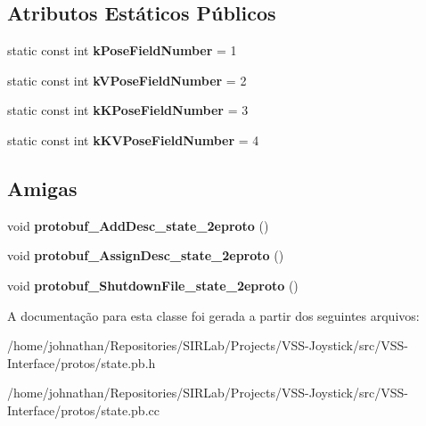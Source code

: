 \subsection*{Atributos Estáticos Públicos}
\begin{DoxyCompactItemize}
\item 
static const int {\bfseries k\+Pose\+Field\+Number} = 1\hypertarget{classvss__state_1_1Ball__State_aa0d51eebda087326095eff02cc80481c}{}\label{classvss__state_1_1Ball__State_aa0d51eebda087326095eff02cc80481c}

\item 
static const int {\bfseries k\+V\+Pose\+Field\+Number} = 2\hypertarget{classvss__state_1_1Ball__State_aa9df3d7a047296c119dfc35ae5e86b54}{}\label{classvss__state_1_1Ball__State_aa9df3d7a047296c119dfc35ae5e86b54}

\item 
static const int {\bfseries k\+K\+Pose\+Field\+Number} = 3\hypertarget{classvss__state_1_1Ball__State_a31603cacf64917d3088585f33290114a}{}\label{classvss__state_1_1Ball__State_a31603cacf64917d3088585f33290114a}

\item 
static const int {\bfseries k\+K\+V\+Pose\+Field\+Number} = 4\hypertarget{classvss__state_1_1Ball__State_a8d49de5cec51b6a22e828da61fa8810b}{}\label{classvss__state_1_1Ball__State_a8d49de5cec51b6a22e828da61fa8810b}

\end{DoxyCompactItemize}
\subsection*{Amigas}
\begin{DoxyCompactItemize}
\item 
void {\bfseries protobuf\+\_\+\+Add\+Desc\+\_\+state\+\_\+2eproto} ()\hypertarget{classvss__state_1_1Ball__State_aab1a2c258f8122a403a979ff57e2a706}{}\label{classvss__state_1_1Ball__State_aab1a2c258f8122a403a979ff57e2a706}

\item 
void {\bfseries protobuf\+\_\+\+Assign\+Desc\+\_\+state\+\_\+2eproto} ()\hypertarget{classvss__state_1_1Ball__State_a57d9367bc8a7a94ead11d11194cca1b6}{}\label{classvss__state_1_1Ball__State_a57d9367bc8a7a94ead11d11194cca1b6}

\item 
void {\bfseries protobuf\+\_\+\+Shutdown\+File\+\_\+state\+\_\+2eproto} ()\hypertarget{classvss__state_1_1Ball__State_a4e6dc5e8e72799859c4e9556d090e57d}{}\label{classvss__state_1_1Ball__State_a4e6dc5e8e72799859c4e9556d090e57d}

\end{DoxyCompactItemize}


A documentação para esta classe foi gerada a partir dos seguintes arquivos\+:\begin{DoxyCompactItemize}
\item 
/home/johnathan/\+Repositories/\+S\+I\+R\+Lab/\+Projects/\+V\+S\+S-\/\+Joystick/src/\+V\+S\+S-\/\+Interface/protos/state.\+pb.\+h\item 
/home/johnathan/\+Repositories/\+S\+I\+R\+Lab/\+Projects/\+V\+S\+S-\/\+Joystick/src/\+V\+S\+S-\/\+Interface/protos/state.\+pb.\+cc\end{DoxyCompactItemize}
